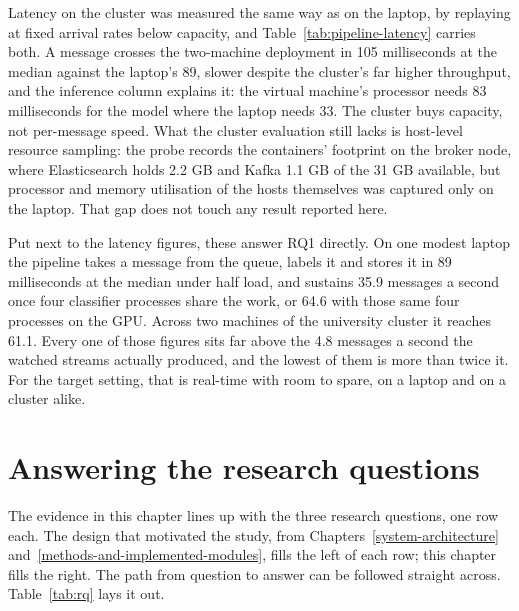 Latency on the cluster was measured the same way as on the laptop, by replaying at fixed arrival rates below capacity, and Table~\ref{tab:pipeline-latency} carries both. A message crosses the two-machine deployment in 105 milliseconds at the median against the laptop's 89, slower despite the cluster's far higher throughput, and the inference column explains it: the virtual machine's processor needs 83 milliseconds for the model where the laptop needs 33. The cluster buys capacity, not per-message speed. What the cluster evaluation still lacks is host-level resource sampling: the probe records the containers' footprint on the broker node, where Elasticsearch holds 2.2 GB and Kafka 1.1 GB of the 31 GB available, but processor and memory utilisation of the hosts themselves was captured only on the laptop. That gap does not touch any result reported here.

Put next to the latency figures, these answer RQ1 directly. On one modest laptop the pipeline takes a message from the queue, labels it and stores it in 89 milliseconds at the median under half load, and sustains 35.9 messages a second once four classifier processes share the work, or 64.6 with those same four processes on the GPU. Across two machines of the university cluster it reaches 61.1. Every one of those figures sits far above the 4.8 messages a second the watched streams actually produced, and the lowest of them is more than twice it. For the target setting, that is real-time with room to spare, on a laptop and on a cluster alike.

\section{Answering the research questions}\label{rq-summary}

The evidence in this chapter lines up with the three research questions, one row each. The design that motivated the study, from Chapters~\ref{system-architecture} and~\ref{methods-and-implemented-modules}, fills the left of each row; this chapter fills the right. The path from question to answer can be followed straight across. Table~\ref{tab:rq} lays it out.

\renewcommand{\arraystretch}{1.5} 

